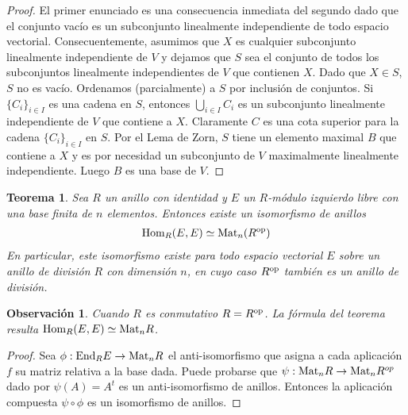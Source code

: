 \documentclass{report}
\newcommand{\Hom}{\textnormal{Hom}}
\newcommand{\End}{\textnormal{End}}
\newcommand{\Mat}{\textnormal{Mat}}
\newtheorem{theorem}{Teorema}
\newtheorem{remark}{Observación}
\begin{document}
  \begin{proof}
    El primer enunciado es una consecuencia inmediata del segundo dado que el conjunto vacío es un subconjunto linealmente independiente de todo espacio vectorial.
    Consecuentemente, asumimos que \(X\) es cualquier subconjunto linealmente independiente de \(V\) y dejamos que \(S\) sea el conjunto de todos los subconjuntos linealmente independientes de \(V\) que contienen \(X\).
    Dado que \(X \in S\), \(S\) no es vacío.
    Ordenamos (parcialmente) a \(S\) por inclusión de conjuntos.
    Si \(\{C_i\}_{i \in I}\) es una cadena en \(S\), entonces \(\bigcup_{i \in I} C_i\) es un subconjunto linealmente independiente de \(V\) que contiene a \(X\).
    Claramente \(C\) es una cota superior para la cadena \(\{C_i\}_{i \in I}\) en \(S\).
    Por el Lema de Zorn, \(S\) tiene un elemento maximal \(B\) que contiene a \(X\) y es por necesidad un subconjunto de \(V\) maximalmente linealmente independiente.
    Luego \(B\) es una base de \(V\).
  \end{proof}

  \begin{theorem}\label{theorem:isomorphismBetweenMatrixAndHomomorphismRings}
    Sea \(R\) un anillo con identidad y \(E\) un \(R\)-módulo izquierdo libre con una base finita de \(n\) elementos.
    Entonces existe un isomorfismo de anillos
    \begin{align}
      \Hom_R(E, E)
      \simeq
      \Mat_n(R^{\textnormal{op}})
    \end{align}
    En particular, este isomorfismo existe para todo espacio vectorial \(E\) sobre un anillo de división \(R\) con dimensión \(n\), en cuyo caso \(R^{\textnormal{op}}\) también es un anillo de división.
  \end{theorem}
  \begin{remark}
    Cuando \(R\) es conmutativo \(R = R^{\textnormal{op}}\).
    La fórmula del teorema resulta \(\Hom_R(E, E) \simeq \Mat_n R\).
  \end{remark}
  \begin{proof}
    Sea \(\phi: \End_R E \rightarrow
    \Mat_n R\) el anti-isomorfismo que asigna a cada aplicación \(f\) su matriz relativa a la base dada.
    Puede probarse que \(\psi : \Mat_n R \rightarrow \Mat_n R^{\mathnormal{op}}\) dado por \(\psi(A) = A^t\) es un anti-isomorfismo de anillos.
    Entonces la aplicación compuesta \(\psi \circ \phi\) es un isomorfismo de anillos.
  \end{proof}
\end{document}
